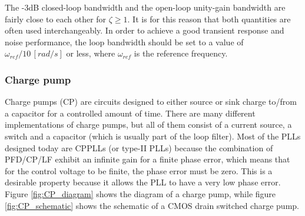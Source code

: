 \noindent The -3dB closed-loop bandwidth and the open-loop unity-gain bandwidth are fairly close to each other for $\zeta \geq 1$. It is 
for this reason that both quantities are often used interchangeably. In order to achieve a good transient response and noise performance,
the loop bandwidth should be set to a value of $\omega_{ref}/10 \, [rad/s]$ or less, where $\omega_{ref}$ is the reference frequency.
\subsubsection{Charge pump}
Charge pumps (CP) are circuits designed to either source or sink charge to/from a capacitor for a controlled amount of time. There are
many different implementations of charge pumps, but all of them consist of a current source, a switch and a capacitor (which is usually 
part of the loop filter). Most of the PLLs designed today are CPPLLs (or type-II PLLs) because the combination of PFD/CP/LF exhibit an 
infinite gain for a finite phase error, which means that for the control voltage to be finite, the phase error must be zero. This is a 
desirable property because it allows the PLL to have a very low phase error. Figure \ref{fig:CP_diagram} shows the diagram of a
charge pump, while figure \ref{fig:CP_schematic} shows the schematic of a CMOS drain switched charge pump.
